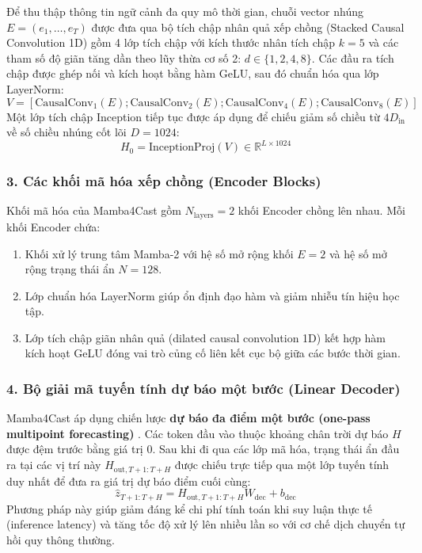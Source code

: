 Để thu thập thông tin ngữ cảnh đa quy mô thời gian, chuỗi vector nhúng $E = (e_1, \dots, e_T)$ được đưa qua bộ tích chập nhân quả xếp chồng (Stacked Causal Convolution 1D) gồm 4 lớp tích chập với kích thước nhân tích chập $k=5$ và các tham số độ giãn tăng dần theo lũy thừa cơ số 2: $d \in \{1, 2, 4, 8\}$. Các đầu ra tích chập được ghép nối và kích hoạt bằng hàm GeLU, sau đó chuẩn hóa qua lớp LayerNorm:
\begin{equation}
    V = \left[ \text{CausalConv}_1(E); \text{CausalConv}_2(E); \text{CausalConv}_4(E); \text{CausalConv}_8(E) \right]
\end{equation}
Một lớp tích chập Inception tiếp tục được áp dụng để chiếu giảm số chiều từ $4 D_{\text{in}}$ về số chiều nhúng cốt lõi $D = 1024$:
\begin{equation}
    H_0 = \text{InceptionProj}(V) \in \mathbb{R}^{L \times 1024}
\end{equation}

\subsubsection{3. Các khối mã hóa xếp chồng (Encoder Blocks)}
Khối mã hóa của Mamba4Cast gồm $N_{\text{layers}} = 2$ khối Encoder chồng lên nhau. Mỗi khối Encoder chứa:
\begin{enumerate}
    \item Khối xử lý trung tâm Mamba-2 với hệ số mở rộng khối $E = 2$ và hệ số mở rộng trạng thái ẩn $N = 128$.
    \item Lớp chuẩn hóa LayerNorm giúp ổn định đạo hàm và giảm nhiễu tín hiệu học tập.
    \item Lớp tích chập giãn nhân quả (dilated causal convolution 1D) kết hợp hàm kích hoạt GeLU đóng vai trò củng cố liên kết cục bộ giữa các bước thời gian.
\end{enumerate}

\subsubsection{4. Bộ giải mã tuyến tính dự báo một bước (Linear Decoder)}
Mamba4Cast áp dụng chiến lược \textbf{dự báo đa điểm một bước (one-pass multipoint forecasting)} \cite{bhethanabhotla2024}. Các token đầu vào thuộc khoảng chân trời dự báo $H$ được đệm trước bằng giá trị $0$. Sau khi đi qua các lớp mã hóa, trạng thái ẩn đầu ra tại các vị trí này $H_{\text{out}, T+1:T+H}$ được chiếu trực tiếp qua một lớp tuyến tính duy nhất để đưa ra giá trị dự báo điểm cuối cùng:
\begin{equation}
    \widehat{z}_{T+1:T+H} = H_{\text{out}, T+1:T+H} W_{\text{dec}} + b_{\text{dec}}
\end{equation}
Phương pháp này giúp giảm đáng kể chi phí tính toán khi suy luận thực tế (inference latency) và tăng tốc độ xử lý lên nhiều lần so với cơ chế dịch chuyển tự hồi quy thông thường.

